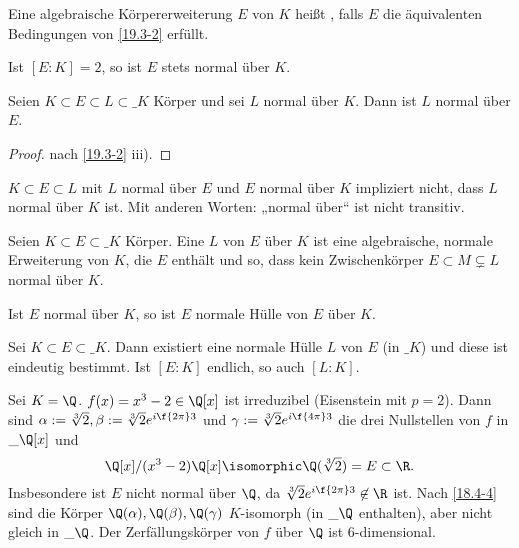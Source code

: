 \begin{df} \label{19.3-3}
	Eine algebraische Körpererweiterung $E$ von $K$ heißt , falls $E$ die äquivalenten Bedingungen von \ref{19.3-2} erfüllt.
\end{df}

\begin{note}
	Ist $[E : K] = 2$, so ist $E$ stets normal über $K$.
\end{note}

\begin{kor} \label{19.3-4}
	Seien $K \subset E \subset L \subset \_K$ Körper und sei $L$ normal über $K$.
	Dann ist $L$ normal über $E$.
	\begin{proof}
		nach \ref{19.3-2} iii).
	\end{proof}
\end{kor}

\begin{note}
	$K \subset E \subset L$ mit $L$ normal über $E$ und $E$ normal über $K$ impliziert nicht, dass $L$ normal über $K$ ist.
	Mit anderen Worten: „normal über“ ist nicht transitiv.
\end{note}

\begin{df} \label{19.3-5}
	Seien $K \subset E \subset \_K$ Körper.
	Eine  $L$ von $E$ über $K$ ist eine algebraische, normale Erweiterung von $K$, die $E$ enthält und so, dass kein Zwischenkörper $E \subset M \subsetneq L$ normal über $K$.
\end{df}

\begin{note}
	Ist $E$ normal über $K$, so ist $E$ normale Hülle von $E$ über $K$.
\end{note}

\begin{st} \label{19.3-6}
	Sei $K \subset E \subset \_K$.
	Dann existiert eine normale Hülle $L$ von $E$ (in $\_K$) und diese ist eindeutig bestimmt.
	Ist $[E : K]$ endlich, so auch $[L : K]$.
\end{st}

\begin{ex} \label{19.3-7}
	Sei $K = \Q$.
	$f(x) = x^3 - 2 \in \Q[x]$ ist irreduzibel (Eisenstein mit $p = 2$).
	Dann sind $\alpha := \sqrt[3]{2}, \beta := \sqrt[3]{2} e^{i\f{2\pi}3}$ und $\gamma := \sqrt[3]{2} e^{i\f{4\pi}3}$ die drei Nullstellen von $f$ in $\_{\Q}[x]$ und
	\[
		\Q[x] / (x^3-2)\Q[x] \isomorphic \Q(\sqrt[3]{2}) = E \subset \R.
	\]
	Insbesondere ist $E$ nicht normal über $\Q$, da $\sqrt[3]{2} e^{i\f{2\pi}3} \not\in \R$ ist.
	Nach \ref{18.4-4} sind die Körper $\Q(\alpha), \Q(\beta), \Q(\gamma)$ $K$-isomorph (in $\_\Q$ enthalten), aber nicht gleich in $\_{\Q}$.
	Der Zerfällungskörper von $f$ über $\Q$ ist 6-dimensional.
\end{ex}


